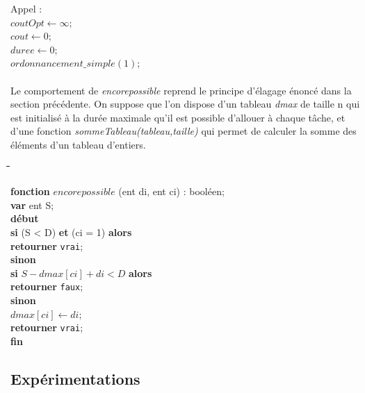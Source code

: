 \documentclass[a4paper, titlepage]{article}
\begin{document}
			\noindent
			Appel :\\
			$coutOpt \leftarrow \infty;$ \\
			$cout \leftarrow 0;$ \\
			$duree \leftarrow 0;$ \\
			$ordonnancement\_simple(1)$;

			\paragraph{}
			Le comportement de \emph{encorepossible} reprend le principe d'élagage énoncé dans la section précédente.
			On suppose que l'on dispose d'un tableau \emph{dmax} de taille n qui est initialisé à la durée maximale qu'il est possible d'allouer à chaque tâche,
			et d'une fonction \emph{sommeTableau(tableau,taille)} qui permet de calculer la somme des éléments d'un tableau d'entiers.

			\begin{tabbing}

			\hspace{1cm}\=\hspace{1cm}\=\hspace{1cm}\=\hspace{1cm}\=\hspace{1cm}\=\kill %

			\textbf{fonction} $encorepossible$ (ent di, ent ci) : booléen; \\
			\textbf{var} ent S; \\
			\textbf{début} \\
			\> \textbf{si} (S < D) \textbf{et} (ci = 1) \textbf{alors} \\
			\>\> \textbf{retourner} \texttt{vrai}; \\
			\> \textbf{sinon} \\
			\>\> \textbf{si} $S-dmax[ci]+di < D$ \textbf{alors} \\
			\>\>\> \textbf{retourner} \texttt{faux}; \\
			\>\> \textbf{sinon} \\
			\>\>\> $dmax[ci] \leftarrow di;$ \\
			\>\>\> \textbf{retourner} \texttt{vrai}; \\
			\textbf{fin}

			\end{tabbing}

	\subsection{Expérimentations}
\end{document}
